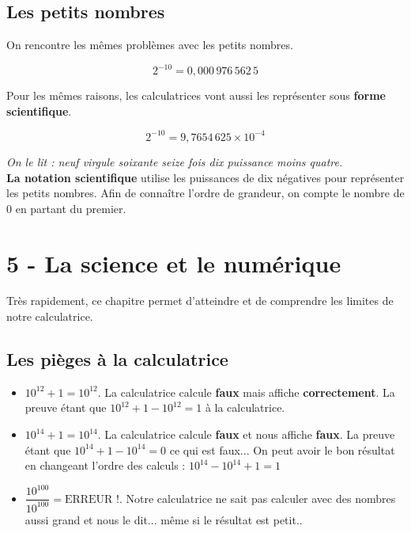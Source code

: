 \newpage

\subsection*{Les petits nombres}

\begin{multicols}{2}

  On rencontre les mêmes problèmes avec les petits nombres.

  $$2^{-10} = 0, 000 \, 976\, 562\, 5$$

  Pour les mêmes raisons, les calculatrices vont aussi les représenter sous \textbf{forme scientifique}.

  $$2^{-10} = 9, 7654 \, 625 \times 10^{-4}$$

  \textit{On le lit : neuf virgule soixante seize fois dix puissance moins quatre.} \\
  \textbf{La notation scientifique} utilise les puissances de dix négatives pour représenter les petits nombres. Afin de connaître l'ordre de grandeur, on compte le nombre de 0 en partant du premier. \\

\end{multicols}
 

\section*{5 - La science et le numérique}

Très rapidement, ce chapitre permet d'atteindre et de comprendre les limites de notre calculatrice. \\

\subsection*{Les pièges à la calculatrice}

  \begin{itemize}[label={$\bullet$}]
  \item $10^{12} + 1 = 10^{12} $. La calculatrice calcule \textbf{faux} mais affiche \textbf{correctement}. La preuve étant que $10^12 + 1 - 10^12 = 1$ à la calculatrice.
  \item $10^{14} + 1 = 10^{14} $. La calculatrice calcule \textbf{faux} et nous affiche \textbf{faux}. La preuve étant que $10^14 + 1 - 10^14 = 0$ ce qui est faux... On peut avoir le bon résultat en changeant l'ordre des calculs : $10^14 - 10^14 +1 = 1$ 
  \item $\dfrac{10^{100}}{10^{100}} = \text{ERREUR !} $. Notre calculatrice ne sait pas calculer avec des nombres aussi grand et nous le dit... même si le résultat est petit..
  \end{itemize}

